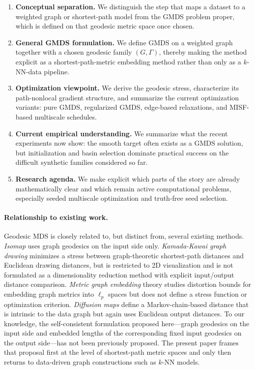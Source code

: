 \documentclass[11pt]{article}
\theoremstyle{definition}
\theoremstyle{plain}
\theoremstyle{remark}
\begin{document}
\begin{enumerate}
  \item \textbf{Conceptual separation.} We distinguish the step that maps a
  dataset to a weighted graph or shortest-path model from the GMDS problem
  proper, which is defined on that geodesic metric space once chosen.

  \item \textbf{General GMDS formulation.} We define GMDS on a weighted
  graph together with a chosen geodesic family $(G,\Gamma)$, thereby making
  the method explicit as a shortest-path-metric embedding method rather than
  only as a $k$-NN-data pipeline.

  \item \textbf{Optimization viewpoint.} We derive the geodesic stress,
  characterize its path-nonlocal gradient structure, and summarize the
  current optimization variants: pure GMDS, regularized GMDS, edge-based
  relaxations, and MISF-based multiscale schedules.

  \item \textbf{Current empirical understanding.} We summarize what the
  recent experiments now show: the smooth target often exists as a GMDS
  solution, but initialization and basin selection dominate practical
  success on the difficult synthetic families considered so far.

  \item \textbf{Research agenda.} We make explicit which parts of the story
  are already mathematically clear and which remain active computational
  problems, especially seeded multiscale optimization and truth-free seed
  selection.
\end{enumerate}

\paragraph{Relationship to existing work.}

Geodesic MDS is closely related to, but distinct from, several existing
methods.  \emph{Isomap} \citep{tenenbaum2000global} uses graph geodesics
on the input side only.  \emph{Kamada-Kawai graph drawing}
\citep{kamada1989algorithm} minimizes a stress between graph-theoretic
shortest-path distances and Euclidean drawing distances, but is restricted
to 2D visualization and is not formulated as a dimensionality reduction
method with explicit input/output distance comparison.  \emph{Metric graph
embedding} theory \citep{bourgain1985lipschitz,
linial1994geometry} studies distortion bounds for embedding graph metrics
into $\ell_p$ spaces but does not define a stress function or optimization
criterion.  \emph{Diffusion maps} \citep{coifman2006diffusion} define a
Markov-chain-based distance that is intrinsic to the data graph but again
uses Euclidean output distances.  To our knowledge, the self-consistent
formulation proposed here---graph geodesics on the input side and
embedded lengths of the corresponding fixed input geodesics on the output
side---has not been previously proposed.  The present paper frames that
proposal first at the level of shortest-path metric spaces and only then
returns to data-driven graph constructions such as $k$-NN models.
\end{document}
